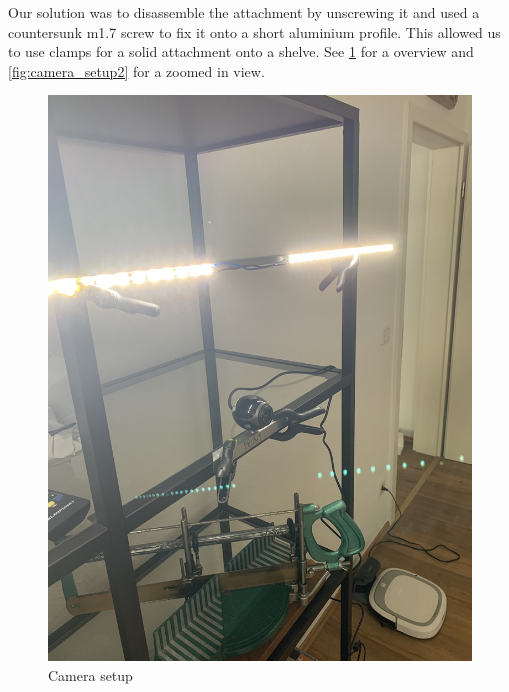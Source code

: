     Our solution was to disassemble the attachment by unscrewing it and used a countersunk m1.7 screw to fix it onto a short aluminium profile. This allowed us to use clamps for a solid attachment onto a shelve. See \ref{fig:camera_setup1} for a overview and \ref{fig:camera_setup2} for a zoomed in view.
    
    \begin{figure}[H] 
            \centering
            \includegraphics[scale=0.17]{images/experiment_4/IMG_1321.jpg}
              \caption{Camera setup}
            \label{fig:camera_setup1}
     \end{figure}
     

